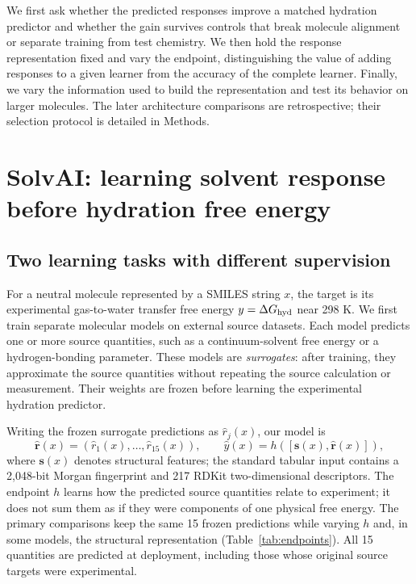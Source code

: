 \documentclass[12pt]{article}
\begin{document}
We first ask whether the predicted responses improve a matched hydration predictor
and whether the gain survives controls that break molecule alignment or separate
training from test chemistry. We then hold the response representation fixed and
vary the endpoint, distinguishing the value of adding responses to a given learner
from the accuracy of the complete learner. Finally, we vary the information used
to build the representation and test its behavior on larger molecules. The later
architecture comparisons are retrospective; their selection protocol is detailed
in Methods.

\section*{SolvAI: learning solvent response before hydration free energy}

\subsection*{Two learning tasks with different supervision}

For a neutral molecule represented by a SMILES string $x$, the target is its
experimental gas-to-water transfer free energy $y=\Delta G_{\rm hyd}$ near 298 K.
We first train separate molecular models on external source datasets. Each model
predicts one or more source quantities, such as a continuum-solvent free energy or
a hydrogen-bonding parameter. These models are \emph{surrogates}: after training,
they approximate the source quantities without repeating the source calculation or
measurement. Their weights are frozen before learning the experimental hydration
predictor.

Writing the frozen surrogate predictions as $\widehat r_j(x)$, our model is
\begin{equation}
 \widehat{\boldsymbol r}(x)=(\widehat r_1(x),\ldots,\widehat r_{15}(x)),
 \qquad \widehat y(x)=h\!\left([\boldsymbol s(x),\widehat{\boldsymbol r}(x)]\right),
 \label{eq:solvai}
\end{equation}
where $\boldsymbol s(x)$ denotes structural features; the standard tabular input
contains a 2,048-bit Morgan fingerprint and 217 RDKit two-dimensional descriptors.
The endpoint $h$ learns how the predicted source quantities relate to experiment;
it does not sum them as if they were components of one physical free energy.
The primary comparisons keep the same 15 frozen predictions while varying $h$
and, in some models, the structural representation (Table~\ref{tab:endpoints}).
All 15 quantities are predicted at deployment, including those whose original
source targets were experimental.
\end{document}
